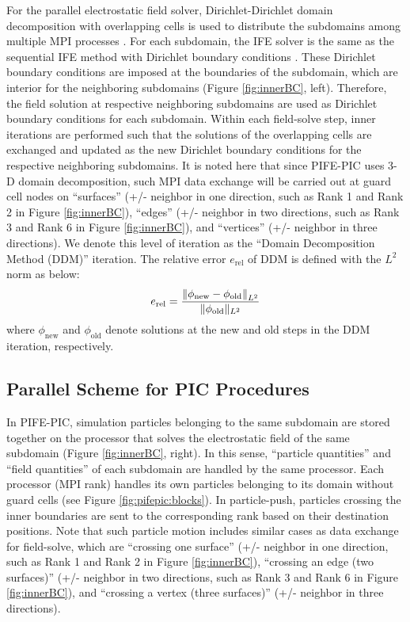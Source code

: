 \documentclass{siamart171218}
\begin{document}
For the parallel electrostatic field solver, Dirichlet-Dirichlet domain decomposition
with overlapping cells is used to distribute the subdomains
among multiple MPI processes \cite{Smith_DomainDecomp_1996}.
For each subdomain,
the IFE solver is the same as the sequential IFE method
with Dirichlet boundary conditions \cite{XHe_NMPDE2008_IFE,XHe_IFE_NonHomo_2011}.
These Dirichlet boundary conditions are imposed at the boundaries of the subdomain,
which are interior for the neighboring subdomains
(Figure \ref{fig:innerBC}, left).
Therefore, the field solution at respective neighboring subdomains are used as
Dirichlet boundary conditions for each subdomain.
Within each field-solve step, inner iterations are performed such that
the solutions of the overlapping cells are exchanged
and updated as the new Dirichlet boundary conditions
for the respective neighboring subdomains.
It is noted here that
since PIFE-PIC uses 3-D domain decomposition,
such MPI data exchange will be carried out
at guard cell nodes on ``surfaces''
(+/- neighbor in one direction, such as Rank 1 and Rank 2 in Figure \ref{fig:innerBC}),
``edges'' (+/- neighbor in two directions,
such as Rank 3 and Rank 6 in Figure \ref{fig:innerBC}),
and ``vertices'' (+/- neighbor in three directions).
We denote this level of iteration as the ``Domain Decomposition Method (DDM)'' iteration.
The relative error $e_\mathrm{rel}$ of DDM is defined with the $L^2$ norm as below:
\begin{equation}
e_\mathrm{rel} =
\frac{\left\|\phi_\mathrm{new} - \phi_{\mathrm{old}}\right\|_{L^2}}{\|\phi_{\mathrm{old}}\|_{L^2}}
\end{equation}
where $\phi_\mathrm{new}$ and $\phi_\mathrm{old}$ denote solutions
at the new and old steps in the DDM iteration, respectively.


\subsection{Parallel Scheme for PIC Procedures}
In PIFE-PIC, simulation particles belonging to the same subdomain are stored together
on the processor that solves the electrostatic field of the same subdomain
(Figure \ref{fig:innerBC}, right).
In this sense, ``particle quantities'' and ``field quantities'' of each subdomain
are handled by the same processor.
Each processor (MPI rank) handles its own particles belonging to its domain
without guard cells (see Figure \ref{fig:pifepic:blocks}).
In particle-push, particles crossing the inner boundaries
are sent to the corresponding rank based on their destination positions.
Note that such particle motion includes similar cases as data exchange for field-solve,
which are ``crossing one surface''
(+/- neighbor in one direction, such as Rank 1 and Rank 2 in Figure \ref{fig:innerBC}),
``crossing an edge (two surfaces)''
(+/- neighbor in two directions, such as Rank 3 and Rank 6 in Figure \ref{fig:innerBC}),
and ``crossing a vertex (three surfaces)''
(+/- neighbor in three directions).
\end{document}
